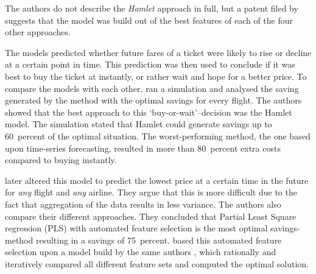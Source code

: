 The authors do not describe the \emph{Hamlet} approach in full, but a patent filed by  suggests that the model was build out of the best features of each of the four other approaches.

The models predicted whether future fares of a ticket were likely to rise or decline at a certain point in time. This prediction was then used to conclude if it was best to buy the ticket at instantly, or rather wait and hope for a better price. To compare the models with each other,  ran a simulation and analysed the saving generated by the method with the optimal savings for every flight. The authors showed that the best approach to this `buy-or-wait'--decision was the Hamlet model. The simulation stated that Hamlet could generate savings up to 60~percent of the optimal situation. The worst-performing method, the one based upon time-series forecasting, resulted in more than 80~percent extra costs compared to buying instantly.

 later altered this model to predict the lowest price at a certain time in the future for \emph{any} flight and \emph{any} airline. They argue that this is more difficult due to the fact that aggregation of the data results in less variance.
The authors also compare their different approaches. They concluded that Partial Least Square regression (PLS) with automated feature selection is the most optimal savings-method resulting in a savings of 75~percent.  based this automated feature selection upon a model build by the same authors \cite{groves2011regression}, which rationally and iteratively compared all different feature sets and computed the optimal solution.


